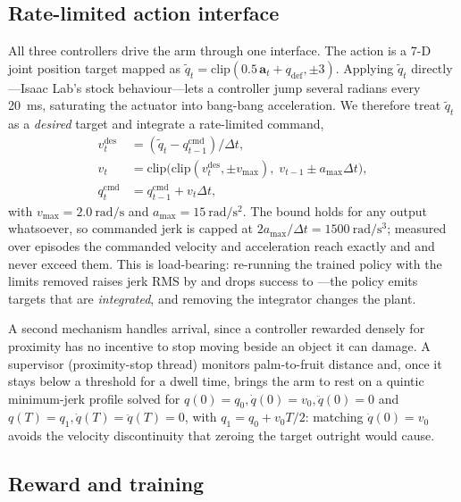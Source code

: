 \documentclass[conference,a4paper]{IEEEtran}
\newcommand{\vect}[1]{\mathbf{#1}}
\begin{document}
\subsection{Rate-limited action interface}
\label{sec:action}

All three controllers drive the arm through one interface. The action is a 7-D
joint position target mapped as $\tilde{q}_t = \mathrm{clip}(0.5\,\vect{a}_t +
q_{\text{def}},\pm3)$. Applying $\tilde{q}_t$ directly---Isaac Lab's stock
behaviour---lets a controller jump several radians every \SI{20}{\milli\second},
saturating the actuator into bang-bang acceleration. We therefore treat
$\tilde{q}_t$ as a \emph{desired} target and integrate a rate-limited command,
\begin{align}
v^{\text{des}}_t &= (\tilde{q}_t - q^{\text{cmd}}_{t-1})/\Delta t, \nonumber\\
v_t &= \mathrm{clip}\big(\mathrm{clip}(v^{\text{des}}_t, \pm v_{\max}),\;
        v_{t-1} \pm a_{\max}\Delta t\big), \label{eq:ratelimit}\\
q^{\text{cmd}}_t &= q^{\text{cmd}}_{t-1} + v_t \Delta t, \nonumber
\end{align}
with $v_{\max}=\SI{2.0}{\radian\per\second}$ and
$a_{\max}=\SI{15}{\radian\per\second\squared}$. The bound holds for any output
whatsoever, so commanded jerk is capped at $2a_{\max}/\Delta t =
\SI{1500}{\radian\per\second\cubed}$; measured over \RESnepisodes{} episodes the
commanded velocity and acceleration reach exactly \REScmdvelOn{} and
\REScmdaccOn{} and never exceed them. This is load-bearing: re-running the
trained policy with the limits removed raises jerk RMS by \RESjerkRatio{} and
drops success to \RESablsuccess{}---the policy emits targets that are
\emph{integrated}, and removing the integrator changes the plant.

A second mechanism handles arrival, since a controller rewarded densely for
proximity has no incentive to stop moving beside an object it can damage. A
supervisor (proximity-stop thread) monitors palm-to-fruit distance and, once it stays below a
threshold for a dwell time, brings the arm to rest on a quintic minimum-jerk
profile solved for $q(0)=q_0,\dot q(0)=v_0,\ddot q(0)=0$ and
$q(T)=q_1,\dot q(T)=\ddot q(T)=0$, with $q_1=q_0+v_0T/2$: matching $\dot
q(0)=v_0$ avoids the velocity discontinuity that zeroing the target outright
would cause.

\subsection{Reward and training}
\label{sec:reward}
\end{document}
